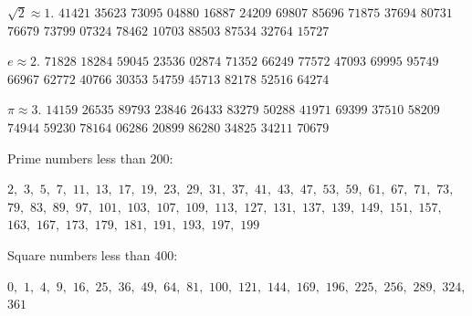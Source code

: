 \documentclass{article}
\begin{document}
\vfill

\begin{multicols}{2}
\(\sqrt 2 \approx 1.\)
\(41421\)
\(35623\)
\(73095\)
\(04880\)
\(16887\)
\(24209\)
\(69807\)
\(85696\)
\(71875\)
\(37694\)
\(80731\)
\(76679\)
\(73799\)
\(07324\)
\(78462\)
\(10703\)
\(88503\)
\(87534\)
\(32764\)
\(15727\)

\vspace{1em}

\(e \approx 2.\)
\(71828\)
\(18284\)
\(59045\)
\(23536\)
\(02874\)
\(71352\)
\(66249\)
\(77572\)
\(47093\)
\(69995\)
\(95749\)
\(66967\)
\(62772\)
\(40766\)
\(30353\)
\(54759\)
\(45713\)
\(82178\)
\(52516\)
\(64274\)

\vspace{1em}

\(\pi \approx 3.\)
\(14159\)
\(26535\)
\(89793\)
\(23846\)
\(26433\)
\(83279\)
\(50288\)
\(41971\)
\(69399\)
\(37510\)
\(58209\)
\(74944\)
\(59230\)
\(78164\)
\(06286\)
\(20899\)
\(86280\)
\(34825\)
\(34211\)
\(70679\)

\columnbreak

Prime numbers less than \(200\):

\(2,\)
\(3,\)
\(5,\)
\(7,\)
\(11,\)
\(13,\)
\(17,\)
\(19,\)
\(23,\)
\(29,\)
\(31,\)
\(37,\)
\(41,\)
\(43,\)
\(47,\)
\(53,\)
\(59,\)
\(61,\)
\(67,\)
\(71,\)
\(73,\)
\(79,\)
\(83,\)
\(89,\)
\(97,\)
\(101,\)
\(103,\)
\(107,\)
\(109,\)
\(113,\)
\(127,\)
\(131,\)
\(137,\)
\(139,\)
\(149,\)
\(151,\)
\(157,\)
\(163,\)
\(167,\)
\(173,\)
\(179,\)
\(181,\)
\(191,\)
\(193,\)
\(197,\)
\(199\)

\vspace{2em}

Square numbers less than \(400\):

\(0,\)
\(1,\)
\(4,\)
\(9,\)
\(16,\)
\(25,\)
\(36,\)
\(49,\)
\(64,\)
\(81,\)
\(100,\)
\(121,\)
\(144,\)
\(169,\)
\(196,\)
\(225,\)
\(256,\)
\(289,\)
\(324,\)
\(361\)
\end{multicols}

\vfill
\end{document}

